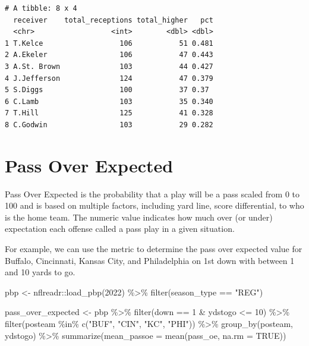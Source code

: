 \documentclass[
  letterpaper,
]{krantz}
\newenvironment{Shaded}{\begin{snugshade}}{\end{snugshade}}
\newcommand{\AttributeTok}[1]{\textcolor[rgb]{0.40,0.45,0.13}{#1}}
\newcommand{\ConstantTok}[1]{\textcolor[rgb]{0.56,0.35,0.01}{#1}}
\newcommand{\DecValTok}[1]{\textcolor[rgb]{0.68,0.00,0.00}{#1}}
\newcommand{\FunctionTok}[1]{\textcolor[rgb]{0.28,0.35,0.67}{#1}}
\newcommand{\NormalTok}[1]{\textcolor[rgb]{0.00,0.23,0.31}{#1}}
\newcommand{\OtherTok}[1]{\textcolor[rgb]{0.00,0.23,0.31}{#1}}
\newcommand{\SpecialCharTok}[1]{\textcolor[rgb]{0.37,0.37,0.37}{#1}}
\newcommand{\StringTok}[1]{\textcolor[rgb]{0.13,0.47,0.30}{#1}}
\begin{document}
\begin{verbatim}
# A tibble: 8 x 4
  receiver    total_receptions total_higher   pct
  <chr>                  <int>        <dbl> <dbl>
1 T.Kelce                  106           51 0.481
2 A.Ekeler                 106           47 0.443
3 A.St. Brown              103           44 0.427
4 J.Jefferson              124           47 0.379
5 S.Diggs                  100           37 0.37 
6 C.Lamb                   103           35 0.340
7 T.Hill                   125           41 0.328
8 C.Godwin                 103           29 0.282
\end{verbatim}

\hypertarget{pass-over-expected}{%
\section{Pass Over Expected}\label{pass-over-expected}}

Pass Over Expected is the probability that a play will be a pass scaled
from 0 to 100 and is based on multiple factors, including yard line,
score differential, to who is the home team. The numeric value indicates
how much over (or under) expectation each offense called a pass play in
a given situation.

For example, we can use the metric to determine the pass over expected
value for Buffalo, Cincinnati, Kansas City, and Philadelphia on 1st down
with between 1 and 10 yards to go.

\begin{Shaded}
\begin{Highlighting}[]
\NormalTok{pbp }\OtherTok{\textless{}{-}}\NormalTok{ nflreadr}\SpecialCharTok{::}\FunctionTok{load\_pbp}\NormalTok{(}\DecValTok{2022}\NormalTok{) }\SpecialCharTok{\%\textgreater{}\%}
  \FunctionTok{filter}\NormalTok{(season\_type }\SpecialCharTok{==} \StringTok{"REG"}\NormalTok{)}

\NormalTok{pass\_over\_expected }\OtherTok{\textless{}{-}}\NormalTok{ pbp }\SpecialCharTok{\%\textgreater{}\%}
  \FunctionTok{filter}\NormalTok{(down }\SpecialCharTok{==} \DecValTok{1} \SpecialCharTok{\&}\NormalTok{ ydstogo }\SpecialCharTok{\textless{}=} \DecValTok{10}\NormalTok{) }\SpecialCharTok{\%\textgreater{}\%}
  \FunctionTok{filter}\NormalTok{(posteam }\SpecialCharTok{\%in\%} \FunctionTok{c}\NormalTok{(}\StringTok{"BUF"}\NormalTok{, }\StringTok{"CIN"}\NormalTok{, }\StringTok{"KC"}\NormalTok{, }\StringTok{"PHI"}\NormalTok{)) }\SpecialCharTok{\%\textgreater{}\%}
  \FunctionTok{group\_by}\NormalTok{(posteam, ydstogo) }\SpecialCharTok{\%\textgreater{}\%}
  \FunctionTok{summarize}\NormalTok{(}\AttributeTok{mean\_passoe =} \FunctionTok{mean}\NormalTok{(pass\_oe, }\AttributeTok{na.rm =} \ConstantTok{TRUE}\NormalTok{))}
\end{Highlighting}
\end{Shaded}
\end{document}
